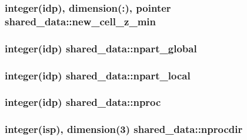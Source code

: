 \subsubsection[{\texorpdfstring{new\+\_\+cell\+\_\+z\+\_\+min}{new_cell_z_min}}]{\setlength{\rightskip}{0pt plus 5cm}integer(idp), dimension(\+:), pointer shared\+\_\+data\+::new\+\_\+cell\+\_\+z\+\_\+min}\hypertarget{namespaceshared__data_aa191272df3d1d06fda40ef3f38987f4d}{}\label{namespaceshared__data_aa191272df3d1d06fda40ef3f38987f4d}
\subsubsection[{\texorpdfstring{npart\+\_\+global}{npart_global}}]{\setlength{\rightskip}{0pt plus 5cm}integer(idp) shared\+\_\+data\+::npart\+\_\+global}\hypertarget{namespaceshared__data_a630ce8e0e1ba68428eacff437d15f6cc}{}\label{namespaceshared__data_a630ce8e0e1ba68428eacff437d15f6cc}
\subsubsection[{\texorpdfstring{npart\+\_\+local}{npart_local}}]{\setlength{\rightskip}{0pt plus 5cm}integer(idp) shared\+\_\+data\+::npart\+\_\+local}\hypertarget{namespaceshared__data_a4d52b152090f02e4e16a9fe24e0e1ec3}{}\label{namespaceshared__data_a4d52b152090f02e4e16a9fe24e0e1ec3}
\subsubsection[{\texorpdfstring{nproc}{nproc}}]{\setlength{\rightskip}{0pt plus 5cm}integer(idp) shared\+\_\+data\+::nproc}\hypertarget{namespaceshared__data_a17ce7b1395fd76d2bb16c475d56cd08b}{}\label{namespaceshared__data_a17ce7b1395fd76d2bb16c475d56cd08b}
\subsubsection[{\texorpdfstring{nprocdir}{nprocdir}}]{\setlength{\rightskip}{0pt plus 5cm}integer(isp), dimension(3) shared\+\_\+data\+::nprocdir}\hypertarget{namespaceshared__data_a73f0e719e591e27a33b1e75d95ae31cb}{}\label{namespaceshared__data_a73f0e719e591e27a33b1e75d95ae31cb}
